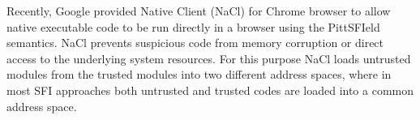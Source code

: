 Recently, Google provided Native Client (NaCl) \cite{NaCl-09} for
Chrome browser to allow native executable code to be run directly in a
browser using the PittSFIeld semantics. NaCl prevents suspicious code
from memory corruption or direct access to the underlying system
resources. For this purpose NaCl loads untrusted modules from the
trusted modules into two different address spaces, where in most SFI
approaches both untrusted and trusted codes are loaded into a common
address space.

%
